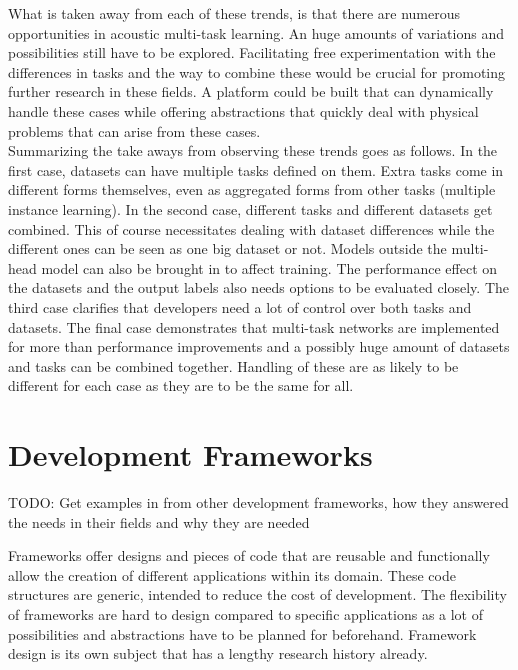 What is taken away from each of these trends, is that there are numerous opportunities in acoustic multi-task learning. An huge amounts of variations and possibilities still have to be explored. Facilitating free experimentation with the differences in tasks and the way to combine these would be crucial for promoting further research in these fields. A platform could be built that can dynamically handle these cases while offering abstractions that quickly deal with physical problems that can arise from these cases. \\

Summarizing the take aways from observing these trends goes as follows. In the first case, datasets can have multiple tasks defined on them. Extra tasks come in different forms themselves, even as aggregated forms from other tasks (multiple instance learning). In the second case, different tasks and different datasets get combined. This of course necessitates dealing with dataset differences while the different ones can be seen as one big dataset or not. Models outside the multi-head model can also be brought in to affect training. The performance effect on the datasets and the output labels also needs options to be evaluated closely. The third case clarifies that developers need a lot of control over both tasks and datasets. The final case demonstrates that multi-task networks are implemented for more than performance improvements and a possibly huge amount of datasets and tasks can be combined together. Handling of these are as likely to be different for each case as they are to be the same for all.\\




\section{Development Frameworks}
TODO: Get examples in from other development frameworks, how they answered the needs in their fields and why they are needed

Frameworks offer designs and pieces of code that are reusable and functionally allow the creation of different applications within its domain. These code structures are generic, intended to reduce the cost of development. The flexibility of frameworks are hard to design compared to specific applications as a lot of possibilities and abstractions have to be planned for beforehand. Framework design is its own subject that has a lengthy research history already. \\

